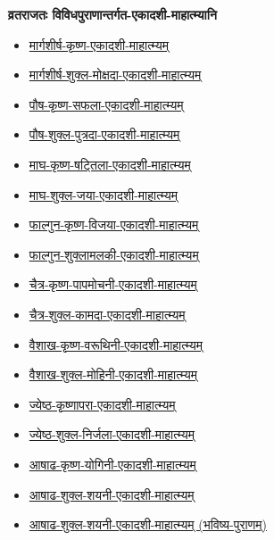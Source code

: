 {\begin{center}
    \centerline{\LARGE \bfseries व्रतराजतः विविधपुराणान्तर्गत-एकादशी-माहात्म्यानि}
    \label{sec:ekadashi_mahatmyam_vrata_raja}
    \begin{itemize}
        \item \hyperref[sec:vrata-raja-margashirsha-krishna]{मार्गशीर्ष-कृष्ण-एकादशी-माहात्म्यम्}
        \item \hyperref[sec:vrata-raja-margashirsha-shukla-mokshada]{मार्गशीर्ष-शुक्ल-मोक्षदा-एकादशी-माहात्म्यम्}
        \item \hyperref[sec:vrata-raja-pausha-krishna-saphala]{पौष-कृष्ण-सफला-एकादशी-माहात्म्यम्}
        \item \hyperref[sec:vrata-raja-pausha-shukla-putrada]{पौष-शुक्ल-पुत्रदा-एकादशी-माहात्म्यम्}
        \item \hyperref[sec:vrata-raja-magha-krishna-shattila]{माघ-कृष्ण-षट्तिला-एकादशी-माहात्म्यम्}
        \item \hyperref[sec:vrata-raja-magha-shukla-jaya]{माघ-शुक्ल-जया-एकादशी-माहात्म्यम्}
        \item \hyperref[sec:vrata-raja-phalguna-krishna-vijaya]{फाल्गुन-कृष्ण-विजया-एकादशी-माहात्म्यम्}
        \item \hyperref[sec:vrata-raja-phalguna-shuklamalaki]{फाल्गुन-शुक्लामलकी-एकादशी-माहात्म्यम्}
        \item \hyperref[sec:vrata-raja-chaitra-krishna-papamochani]{चैत्र-कृष्ण-पापमोचनी-एकादशी-माहात्म्यम्}
        \item \hyperref[sec:vrata-raja-chaitra-shukla-kamada]{चैत्र-शुक्ल-कामदा-एकादशी-माहात्म्यम्}
        \item \hyperref[sec:vrata-raja-vaishakha-krishna-varuthini]{वैशाख-कृष्ण-वरूथिनी-एकादशी-माहात्म्यम्}
        \item \hyperref[sec:vrata-raja-vaishakha-shukla-mohini]{वैशाख-शुक्ल-मोहिनी-एकादशी-माहात्म्यम्}
        \item \hyperref[sec:vrata-raja-jyeshtha-krishnapara]{ज्येष्ठ-कृष्णापरा-एकादशी-माहात्म्यम्}
        \item \hyperref[sec:vrata-raja-jyeshtha-shukla-nirjala]{ज्येष्ठ-शुक्ल-निर्जला-एकादशी-माहात्म्यम्}
        \item \hyperref[sec:vrata-raja-ashadha-krishna-yogini]{आषाढ-कृष्ण-योगिनी-एकादशी-माहात्म्यम्}
        \item \hyperref[sec:vrata-raja-ashadha-shukla-shayani]{आषाढ-शुक्ल-शयनी-एकादशी-माहात्म्यम्}
        \item \hyperref[sec:vrata-raja-ashadha-shukla-shayani-bhavishya]{आषाढ-शुक्ल-शयनी-एकादशी-माहात्म्यम् (भविष्य-पुराणम्)}

\end{itemize}
\end{center}}
